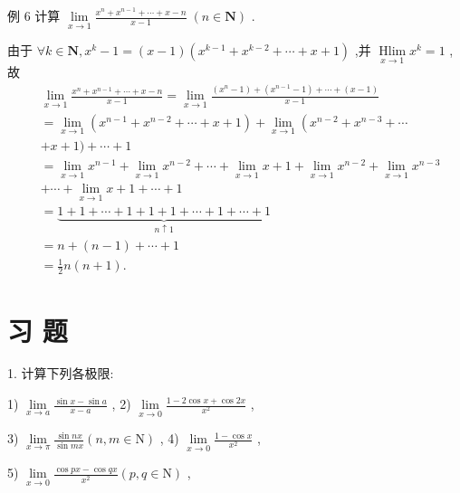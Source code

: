 例 6 计算 $\mathop{\lim }\limits_{{x \rightarrow  1}}\frac{{x}^{n} + {x}^{n - 1} + \cdots  + x - n}{x - 1}\;\left( {n \in  \mathbf{N}}\right)$ .

由于 $\forall k \in  \mathbf{N},{x}^{k} - 1 = \left( {x - 1}\right) \left( {{x}^{k - 1} + {x}^{k - 2} + \cdots  + x + 1}\right)$ ,并 $\mathop{\operatorname{Hlim}}\limits_{{x \rightarrow  1}}{x}^{k} = 1$ ,故
\begin{align*}
	&\mathop{\lim }\limits_{{x \rightarrow  1}}\frac{{x}^{n} + {x}^{n - 1} + \cdots  + x - n}{x - 1} = \mathop{\lim }\limits_{{x \rightarrow  1}}\frac{\left( {{x}^{n} - 1}\right)  + \left( {{x}^{n - 1} - 1}\right)  + \cdots  + \left( {x - 1}\right) }{x - 1}\\
	&= \mathop{\lim }\limits_{{x \rightarrow  1}}\left( {{x}^{n - 1} + {x}^{n - 2} + \cdots  + x + 1}\right)  + \mathop{\lim }\limits_{{x \rightarrow  1}}\left( {{x}^{n - 2} + {x}^{n - 3} + \cdots }\right.\\
	&+ x + 1) + \cdots  + 1\\
	&= \mathop{\lim }\limits_{{x \rightarrow  1}}{x}^{n - 1} + \mathop{\lim }\limits_{{x \rightarrow  1}}{x}^{n - 2} + \cdots  + \mathop{\lim }\limits_{{x \rightarrow  1}}x + 1 + \mathop{\lim }\limits_{{x \rightarrow  1}}{x}^{n - 2} + \mathop{\lim }\limits_{{x \rightarrow  1}}{x}^{n - 3}\\
	&+ \cdots  + \mathop{\lim }\limits_{{x \rightarrow  1}}x + 1 + \cdots  + 1\\
	&= \underset{n \uparrow  1}{\underbrace{1 + 1 + \cdots  + 1 + 1 + 1 + \cdots  + 1 + \cdots  + 1}}\\
	&= n + \left( {n - 1}\right)  + \cdots  + 1\\
	&= \frac{1}{2}n\left( {n + 1}\right) .
\end{align*}

\section*{习 题}

1. 计算下列各极限:

1) $\mathop{\lim }\limits_{{x \rightarrow  a}}\frac{\sin x - \sin a}{x - a}$ , 2) $\mathop{\lim }\limits_{{x \rightarrow  0}}\frac{1 - 2\cos x + \cos {2x}}{{x}^{2}}$ ,

3) $\mathop{\lim }\limits_{{x \rightarrow  \pi }}\frac{\sin {nx}}{\sin {mx}}\left( {n,m \in  \mathrm{N}}\right)$ , 4) $\mathop{\lim }\limits_{{x \rightarrow  0}}\frac{1 - \cos x}{{x}^{2}}$ ,

5) $\mathop{\lim }\limits_{{x \rightarrow  0}}\frac{\cos {px} - \cos {qx}}{{x}^{2}}\left( {p,q \in  \mathrm{N}}\right)$ ,

